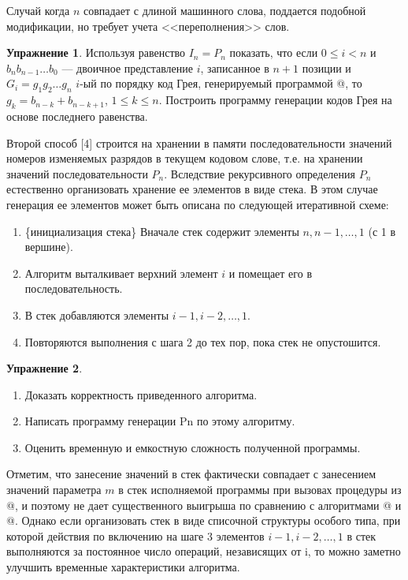 \documentclass[12pt,a4paper]{article}
\theoremstyle{plain}
\theoremstyle{definition}
\newtheorem*{task}{Упражнение}
\theoremstyle{remark}
\begin{document}
Случай когда $n$ совпадает с длиной машинного слова, поддается подобной модификации, но требует учета <<переполнения>> слов.

\begin{task}
Используя равенство $I_n = P_n$ показать, что если $0\le i<n$ и $b_n b_{n-1}\ldots b_0$ --- двоичное представление $i$, записанное в $n+1$ позиции и $G_i = g_1 g_2 \ldots g_n$ $i$-ый по порядку код Грея, генерируемый программой @, то $g_k = b_{n-k}+b_{n-k+1}$, $1\le k\le n$. Построить программу генерации кодов Грея на основе последнего равенства.
\end{task}

Второй способ [4] строится на хранении в памяти последовательности значений номеров изменяемых разрядов в текущем кодовом слове, т.е. на хранении значений последовательности $P_n$. Вследствие рекурсивного определения $P_n$ естественно организовать хранение ее элементов в виде стека. В этом случае генерация ее элементов может быть описана по следующей итеративной схеме:

\begin{enumerate}
\item \{инициализация стека\} Вначале стек содержит элементы $n,n-1,\ldots,1$ (с 1 в вершине).
\item Алгоритм выталкивает верхний элемент $i$ и помещает его в последовательность.
\item В стек добавляются элементы $i-1,i-2,\ldots,1$.
\item Повторяются выполнения с шага 2 до тех пор, пока стек не опустошится.
\end{enumerate}

\begin{task}
~\\
\begin{enumerate}
\item Доказать корректность приведенного алгоритма.
\item Написать программу генерации Pn по этому алгоритму.
\item Оценить временную и емкостную сложность полученной программы.
\end{enumerate}
\end{task}

Отметим, что занесение значений в стек фактически совпадает с занесением значений параметра $m$ в стек исполняемой программы при вызовах процедуры \verb@GRAY@ из @, и поэтому не дает существенного выигрыша по сравнению с алгоритмами @ и @. Однако если организовать стек в виде списочной структуры особого типа, при которой действия по включению на шаге 3 элементов $i-1,i-2,\ldots,1$ в стек выполняются за постоянное число операций, независящих от i, то можно заметно улучшить временные характеристики алгоритма.
\end{document}
